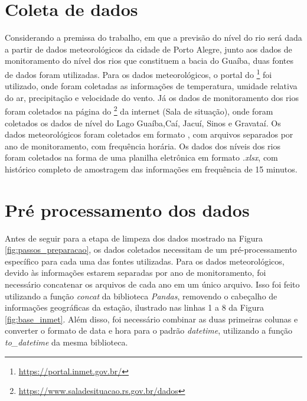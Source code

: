 

\section{Coleta de dados}
\label{sec:coleta_dados}

Considerando a premissa do trabalho, em que a previsão do nível do rio será dada a partir de dados meteorológicos da cidade de Porto Alegre, junto aos dados de monitoramento do nível dos rios que constituem a bacia do Guaíba, duas fontes de dados foram utilizadas. Para os dados meteorológicos, o portal do \footnote{\url{https://portal.inmet.gov.br/}} foi utilizado, onde foram coletadas as informações de temperatura, umidade relativa do ar, precipitação e velocidade do vento. Já os dados de monitoramento dos rios foram coletados na página do \footnote{\url{https://www.saladesituacao.rs.gov.br/dados}} da internet (Sala de situação), onde foram coletados os dados de nível do Lago Guaíba,Caí, Jacuí, Sinos e Gravataí. Os dados meteorológicos foram coletados em formato , com arquivos separados por ano de monitoramento, com frequência horária. Os dados dos níveis dos rios foram coletados na forma de uma planilha eletrônica em formato \textit{.xlsx}, com histórico completo de amostragem das informações em frequência de 15 minutos.

\section{Pré processamento dos dados}
\label{sec:pre_processamento_dos_dados}

Antes de seguir para a etapa de limpeza dos dados mostrado na Figura \ref{fig:passos_preparacao}, os dados coletados necessitam de um pré-processamento específico para cada uma das fontes utilizadas. Para os dados meteorológicos, devido às informações estarem separadas por ano de monitoramento, foi necessário concatenar os arquivos de cada ano em um único arquivo. Isso foi feito utilizando a função \textit{concat} da biblioteca \textit{Pandas}, removendo o cabeçalho de informações geográficas da estação, ilustrado nas linhas 1 a 8 da Figura \ref{fig:base_inmet}. Além disso, foi necessário combinar as duas primeiras colunas e converter o formato de data e hora para o padrão \textit{datetime}, utilizando a função \textit{to\_datetime} da mesma biblioteca. 

